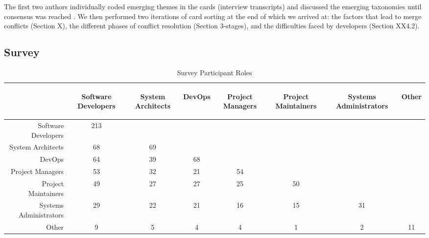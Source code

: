The first two authors individually coded emerging themes in the cards (interview transcripts) and discussed the emerging taxonomies until consensus was reached \cite{card_sort}. We then performed two iterations of card sorting at the end of which we arrived at: the factors that lead to merge conflicts (Section X), the different phases of conflict resolution (Section 3-stages), and the difficulties faced by developers (Section XX4.2).


\subsection{Survey}

\begin{table*}[!t]
\renewcommand{\arraystretch}{1.3}
\caption{Survey Participant Roles}
\label{survey_roles}
\centering
\begin{tabular}{|r|c|c|c|c|c|c|c|}
	& \begin{rotate}{45} Software Developers \end{rotate} 
	& \begin{rotate}{45} System Architects \end{rotate} 
	& \begin{rotate}{45} DevOps \end{rotate} 
	& \begin{rotate}{45} Project Managers \end{rotate}
	& \begin{rotate}{45} Project Maintainers \end{rotate}
	& \begin{rotate}{45} Systems Administrators \end{rotate}
	& \begin{rotate}{45} Other \end{rotate}\\
	\hline
	Software Developers & 213 & & & & & & \\
	\hline
	System Architects & 68 & 69 & & & & & \\
	\hline
	DevOps & 64 & 39 & 68 & & & & \\
	\hline
	Project Managers & 53 & 32 & 21 & 54 & & & \\
	\hline
	Project Maintainers & 49 & 27 & 27 & 25 & 50 & & \\
	\hline
	Systems Administrators & 29 & 22 & 21 & 16 & 15 & 31 & \\
	\hline
	Other & 9 & 5 & 4 & 4 & 1 & 2 & 11 \\
	\hline
\end{tabular}
\end{table*}

